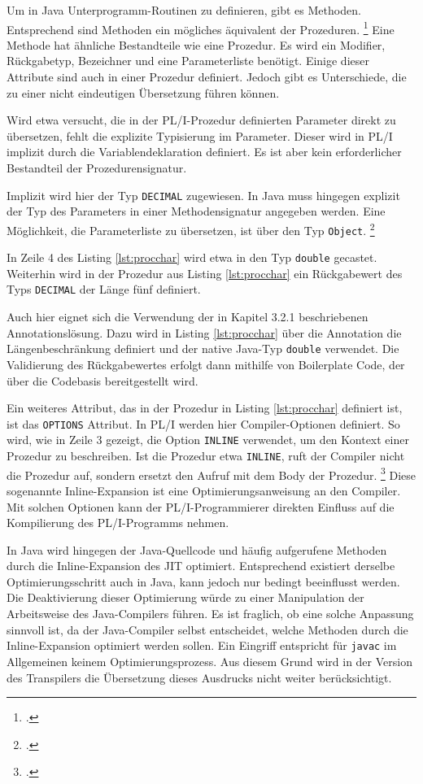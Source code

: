 Um in Java Unterprogramm-Routinen zu definieren, gibt es Methoden. 
Entsprechend sind Methoden ein mögliches äquivalent der Prozeduren. \footcite[Vgl. ][]{oracle}
Eine Methode hat ähnliche Bestandteile wie eine Prozedur.
Es wird ein Modifier, Rückgabetyp, Bezeichner und eine Parameterliste benötigt.
Einige dieser Attribute sind auch in einer Prozedur definiert.
Jedoch gibt es Unterschiede, die zu einer nicht eindeutigen Übersetzung führen können.

Wird etwa versucht, die in der PL/I-Prozedur definierten Parameter direkt zu übersetzen, fehlt die explizite Typisierung im Parameter. Dieser wird in PL/I implizit durch die Variablendeklaration definiert.
Es ist aber kein erforderlicher Bestandteil der Prozedurensignatur. 

Implizit wird hier der Typ \verb+DECIMAL+ zugewiesen. 
In Java muss hingegen explizit der Typ des Parameters in einer Methodensignatur angegeben werden.
Eine Möglichkeit, die Parameterliste zu übersetzen, ist über den Typ \verb+Object+. \footcite[Vgl. ][]{objectdocs}

In Zeile 4 des Listing \ref{lst:procchar} wird etwa in den Typ \verb+double+ gecastet. Weiterhin wird in der Prozedur aus Listing \ref{lst:procchar} ein Rückgabewert des Typs \verb+DECIMAL+ der L\"ange f\"unf definiert.

Auch hier eignet sich die Verwendung der in Kapitel 3.2.1 beschriebenen Annotationslösung. Dazu wird in Listing \ref{lst:procchar} über die Annotation die Längenbeschränkung definiert und der native Java-Typ \verb+double+ verwendet.
Die Validierung des Rückgabewertes erfolgt dann mithilfe von Boilerplate Code, der über die Codebasis bereitgestellt wird.

Ein weiteres Attribut, das in der Prozedur in Listing \ref{lst:procchar} definiert ist, ist das \verb+OPTIONS+
Attribut.
In PL/I werden hier Compiler-Optionen definiert. So wird, wie in Zeile 3 gezeigt, die Option \verb+INLINE+ verwendet, um den Kontext einer Prozedur zu beschreiben. Ist die Prozedur etwa \verb+INLINE+, ruft der Compiler nicht die Prozedur auf, sondern ersetzt den Aufruf mit dem Body der Prozedur. \footcite[Vgl.][]{optionsstmt} Diese sogenannte Inline-Expansion ist eine Optimierungsanweisung an den Compiler. Mit solchen Optionen kann der PL/I-Programmierer direkten Einfluss auf die Kompilierung des PL/I-Programms nehmen.

In Java wird hingegen der Java-Quellcode und häufig aufgerufene Methoden durch die Inline-Expansion des \ac{JIT} optimiert. Entsprechend existiert derselbe Optimierungsschritt auch in Java, kann jedoch nur bedingt beeinflusst werden. Die Deaktivierung dieser Optimierung würde zu einer Manipulation der Arbeitsweise des Java-Compilers führen. Es ist fraglich, ob eine solche Anpassung sinnvoll ist, da der Java-Compiler selbst entscheidet, welche Methoden durch die Inline-Expansion optimiert werden sollen. Ein Eingriff entspricht für \verb+javac+ im Allgemeinen keinem Optimierungsprozess.
Aus diesem Grund wird in der Version des Transpilers die Übersetzung dieses Ausdrucks nicht weiter berücksichtigt.

